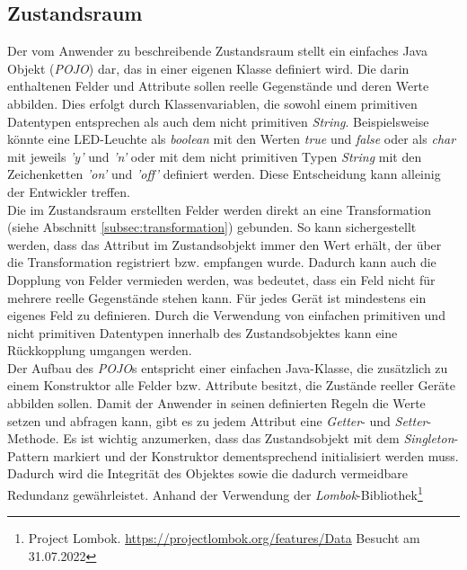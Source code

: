 \subsection{Zustandsraum}
\label{subsec:zustandsraum}
    Der vom Anwender zu beschreibende Zustandsraum stellt ein einfaches Java Objekt (\textit{\acs{POJO}}) dar, das in einer eigenen Klasse definiert wird. 
    Die darin enthaltenen Felder und Attribute sollen reelle Gegenstände und deren Werte abbilden. Dies erfolgt durch 
    Klassenvariablen, die sowohl einem primitiven Datentypen entsprechen als auch dem nicht primitiven \textit{String}. Beispielsweise könnte eine LED-Leuchte als \textit{boolean} mit den 
    Werten \textit{true} und \textit{false} oder als \textit{char} mit jeweils \textit{'y'} und \textit{'n'} oder mit dem nicht primitiven 
    Typen \textit{String} mit den Zeichenketten \textit{'on'} und \textit{'off'} definiert 
    werden. Diese Entscheidung kann alleinig der Entwickler treffen. 
    \\
    \linebreak
    Die im Zustandsraum erstellten Felder werden direkt an eine Transformation (siehe Abschnitt \ref{subsec:transformation}) gebunden. So kann sichergestellt werden, dass 
    das Attribut im Zustandsobjekt immer den Wert erhält, der über die Transformation registriert bzw. empfangen wurde. Dadurch kann 
    auch die Dopplung von Felder vermieden werden, was bedeutet, dass ein Feld nicht für mehrere reelle Gegenstände stehen kann. Für jedes 
    Gerät ist mindestens ein eigenes Feld zu definieren. Durch die Verwendung von einfachen primitiven und nicht primitiven Datentypen innerhalb 
    des Zustandsobjektes kann eine Rückkopplung umgangen werden. 
    \\
    \linebreak
    Der Aufbau des \textit{\acs{POJO}}s entspricht einer einfachen Java-Klasse, die zusätzlich zu einem Konstruktor alle Felder bzw. Attribute besitzt, die Zustände reeller 
    Geräte abbilden sollen. Damit der Anwender in seinen definierten Regeln die Werte setzen und abfragen kann, gibt es zu jedem Attribut eine \textit{Getter}- und \textit{Setter}-Methode.
    Es ist wichtig anzumerken, dass das Zustandsobjekt mit dem \textit{Singleton}-Pattern markiert und der Konstruktor dementsprechend initialisiert werden muss. Dadurch wird 
    die Integrität des Objektes sowie die dadurch vermeidbare Redundanz gewährleistet. Anhand der Verwendung der \textit{Lombok}-Bibliothek\footnote{Project Lombok. \url{https://projectlombok.org/features/Data} Besucht am 31.07.2022} 

